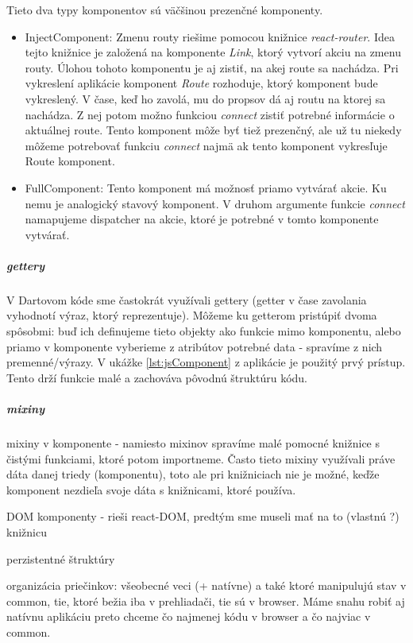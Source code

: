 Tieto dva typy komponentov sú väčšinou prezenčné komponenty.

\begin{itemize}
\item {InjectComponent}: Zmenu routy riešime pomocou knižnice \emph{react-router}. %
Idea tejto knižnice je založená na komponente \emph{Link}, ktorý vytvorí akciu na zmenu routy. Úlohou tohoto komponentu je aj zistiť, na akej route sa nachádza. 
Pri vykreslení aplikácie komponent \emph{Route} rozhoduje, ktorý komponent bude vykreslený. V čase, keď ho zavolá, mu do propsov dá aj routu na ktorej sa nachádza. Z nej potom možno funkciou \emph{connect} zistiť potrebné informácie o aktuálnej route. %
Tento komponent môže byť tiež prezenčný, ale už tu niekedy môžeme potrebovať funkciu \emph{connect} najmä ak tento komponent vykresľuje Route komponent.

\item {FullComponent}: Tento komponent má možnosť priamo vytvárať akcie. Ku nemu je analogický stavový komponent. V druhom argumente funkcie \emph{connect} namapujeme dispatcher na akcie, ktoré je potrebné v tomto komponente vytvárať.
\end{itemize}

\subparagraph{gettery}
V Dartovom kóde sme častokrát využívali gettery (getter v čase zavolania vyhodnotí výraz, ktorý reprezentuje). Môžeme ku getterom pristúpiť dvoma spôsobmi: buď ich definujeme tieto objekty ako funkcie mimo komponentu, alebo priamo v komponente vyberieme z atribútov potrebné data - spravíme z nich premenné/výrazy. V ukážke \ref{lst:jsComponent} z aplikácie je použitý prvý prístup. Tento drží funkcie malé a zachováva pôvodnú štruktúru kódu.

\subparagraph{mixiny}
mixiny v komponente - namiesto mixinov spravíme malé pomocné knižnice s čistými funkciami, ktoré potom importneme. Často tieto mixiny využívali práve dáta danej triedy (komponentu), toto ale pri knižniciach nie je možné, keďže komponent nezdieľa svoje dáta s knižnicami, ktoré používa.

DOM komponenty - rieši react-DOM, predtým sme museli mať na to (vlastnú ?) knižnicu

perzistentné štruktúry%

organizácia priečinkov: všeobecné veci (+ natívne) a také ktoré manipulujú stav v common, tie, ktoré bežia iba v prehliadači, tie sú v browser. Máme snahu robiť aj natívnu aplikáciu %
preto chceme čo najmenej kódu v browser a čo najviac v common.

